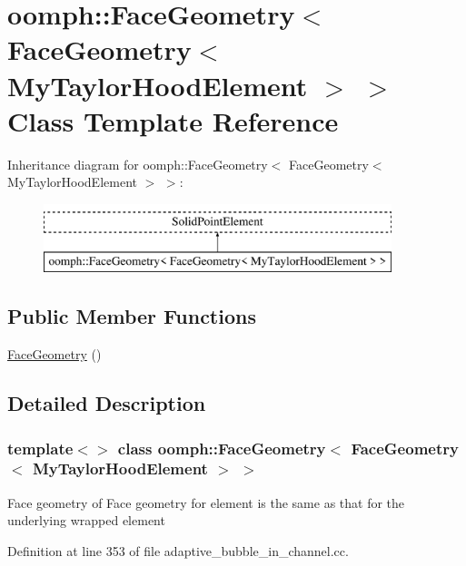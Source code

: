 \hypertarget{classoomph_1_1FaceGeometry_3_01FaceGeometry_3_01MyTaylorHoodElement_01_4_01_4}{}\section{oomph\+:\+:Face\+Geometry$<$ Face\+Geometry$<$ My\+Taylor\+Hood\+Element $>$ $>$ Class Template Reference}
\label{classoomph_1_1FaceGeometry_3_01FaceGeometry_3_01MyTaylorHoodElement_01_4_01_4}
Inheritance diagram for oomph\+:\+:Face\+Geometry$<$ Face\+Geometry$<$ My\+Taylor\+Hood\+Element $>$ $>$\+:\begin{figure}[H]
\begin{center}
\leavevmode
\includegraphics[height=2.000000cm]{classoomph_1_1FaceGeometry_3_01FaceGeometry_3_01MyTaylorHoodElement_01_4_01_4}
\end{center}
\end{figure}
\subsection*{Public Member Functions}
\begin{DoxyCompactItemize}
\item 
\hyperlink{classoomph_1_1FaceGeometry_3_01FaceGeometry_3_01MyTaylorHoodElement_01_4_01_4_a35f1bde1f3b3cc7c29d417cd75f0ef86}{Face\+Geometry} ()
\end{DoxyCompactItemize}


\subsection{Detailed Description}
\subsubsection*{template$<$$>$\newline
class oomph\+::\+Face\+Geometry$<$ Face\+Geometry$<$ My\+Taylor\+Hood\+Element $>$ $>$}

Face geometry of Face geometry for element is the same as that for the underlying wrapped element 

Definition at line 353 of file adaptive\+\_\+bubble\+\_\+in\+\_\+channel.\+cc.



